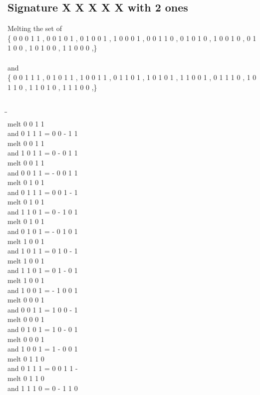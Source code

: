 \documentclass{article}
\begin{document}
\subsection{Signature X X X X X with 2 ones}
Melting the set of\\
\{ 0  0  0  1  1 , 0  0  1  0  1 , 0  1  0  0  1 , 1  0  0  0  1 , 0  0  1  1  0 , 0  1  0  1  0 , 1  0  0  1  0 , 0  1  1  0  0 , 1  0  1  0  0 , 1  1  0  0  0 ,\}\\\\
and\\
\{ 0  0  1  1  1 , 0  1  0  1  1 , 1  0  0  1  1 , 0  1  1  0  1 , 1  0  1  0  1 , 1  1  0  0  1 , 0  1  1  1  0 , 1  0  1  1  0 , 1  1  0  1  0 , 1  1  1  0  0 ,\}\\\\
\begin{tabbing}
\hspace{3cm}\=\hspace{3cm}\=\hspace{3cm}\\[1cm]
melt  0  0  1  1 \\
and  0  1  1  1 \>
 =  0  0  -  1  1 \\[1mm]
melt  0  0  1  1 \\
and  1  0  1  1 \>
 =  0  -  0  1  1 \\[1mm]
melt  0  0  1  1 \\
and  0  0  1  1 \>
 =  -  0  0  1  1 \\[1mm]
melt  0  1  0  1 \\
and  0  1  1  1 \>
 =  0  0  1  -  1 \\[1mm]
melt  0  1  0  1 \\
and  1  1  0  1 \>
 =  0  -  1  0  1 \\[1mm]
melt  0  1  0  1 \\
and  0  1  0  1 \>
 =  -  0  1  0  1 \\[1mm]
melt  1  0  0  1 \\
and  1  0  1  1 \>
 =  0  1  0  -  1 \\[1mm]
melt  1  0  0  1 \\
and  1  1  0  1 \>
 =  0  1  -  0  1 \\[1mm]
melt  1  0  0  1 \\
and  1  0  0  1 \>
 =  -  1  0  0  1 \\[1mm]
melt  0  0  0  1 \\
and  0  0  1  1 \>
 =  1  0  0  -  1 \\[1mm]
melt  0  0  0  1 \\
and  0  1  0  1 \>
 =  1  0  -  0  1 \\[1mm]
melt  0  0  0  1 \\
and  1  0  0  1 \>
 =  1  -  0  0  1 \\[1mm]
melt  0  1  1  0 \\
and  0  1  1  1 \>
 =  0  0  1  1  - \\[1mm]
melt  0  1  1  0 \\
and  1  1  1  0 \>
 =  0  -  1  1  0 \\[1mm]
\end{tabbing}
\end{document}
